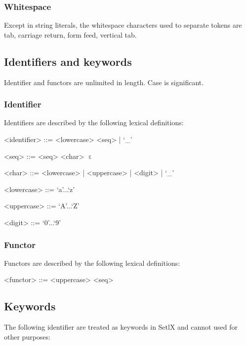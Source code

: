 %
\subsubsection{Whitespace}
Except in string literals, the whitespace characters used to separate tokens are tab, carriage return, form feed, vertical tab.

%
%
\subsection{Identifiers and keywords}

Identifier and functors are unlimited in length. Case is significant.

%
\subsubsection{Identifier}

Identifiers are described by the following lexical definitions:

\begin{grammar}
<identifier> ::= <lowercase> <seq> | `_'

<seq> ::= <seq> <char>
\alt $\upepsilon$

<char> ::= <lowercase> | <uppercase> | <digit> | `_'

<lowercase>  ::=  `a'...`z'

<uppercase>  ::=  `A'...`Z'

<digit>      ::=  `0'...`9'
\end{grammar}

%
\subsubsection{Functor}

Functors are described by the following lexical definitions:

\begin{grammar}
<functor> ::= <uppercase> <seq>
\end{grammar}

%
%
\subsection{Keywords}
The following identifier are treated as keywords in SetlX and cannot used for other purposes:

